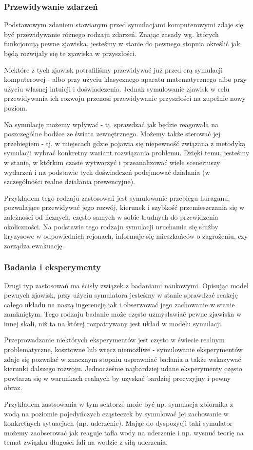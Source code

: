 \subsubsection{Przewidywanie zdarzeń}
\par{
Podstawowym zdaniem stawianym przed symulacjami komputerowymi zdaje się być przewidywanie różnego rodzaju zdarzeń. Znając zasady wg. których funkcjonują pewne zjawiska, jesteśmy w stanie do pewnego stopnia określić jak będą rozwijały się te zjawiska w przyszłości.
}
\par{
Niektóre z tych zjawisk potrafiliśmy przewidywać już przed erą symulacji komputerowej - albo przy użyciu klasycznego aparatu matematycznego albo przy użyciu własnej intuicji i doświadczenia. Jednak symulowanie zjawisk w celu przewidywania ich rozwoju przenosi przewidywanie przyszłości na zupełnie nowy poziom.
}
\par{
Na symulację możemy wpływać - tj. sprawdzać jak będzie reagowała na poszczególne bodźce ze świata zewnętrznego. Możemy także sterować jej przebiegiem - tj. w miejscach gdzie pojawia się niepewność związana z metodyką symulacji wybrać konkretny wariant rozwiązania problemu.
Dzięki temu, jesteśmy w stanie, w którkim czasie wytworzyć i przeanalizować wiele sceneriuszy wydarzeń i na podstawie tych doświadczeń podejmować działania (w szczególności realne działania prewencyjne).
}
\par{
Przykładem tego rodzaju zastosowań jest symulowanie przebiegu huraganu, pozwalające przewidywać jego rozwój, kierunek i szybkość przemieszczania się w zależności od licznych, często samych w sobie trudnych do przewidzenia okoliczności. Na podstawie tego rodzaju symulacji uruchamia się służby kryzysowe w odpowiednich rejonach, informuje się mieszkańców o zagrożeniu, czy zarządza ewakuację.
}

\subsubsection{Badania i eksperymenty}
\par{
Drugi typ zastosowań ma ścisły związek z badaniami naukowymi.
Opisując model pewnych zjawisk, przy użyciu symulatora jesteśmy w stanie sprawdzać reakcję całego układu na naszą ingerencję jak i obserwować jego zachowanie w stanie zamkniętym. Tego rodzaju badanie może często uzmysławiać pewne zjawiska w innej skali, niż ta na której rozpatrywany jest układ w modelu symulacji.
}
\par{
Przeprowadzanie niektórych eksperymentów jest często w świecie realnym problematyczne, kosztowne lub wręcz niemożliwe - symulowanie eksperymentów zdaje się pozwalać w znacznym stopniu usprawniać badania a także wskazywać kierunki dalszego rozwoju. Jednocześnie najbardziej udane eksperymenty często powtarza się w warunkach realnych by uzyskać bardziej precyzyjny i pewny obraz.
}
\par{
Przykładem zastsowania w tym sektorze może być np. symulacja zbiornika z wodą na poziomie pojedyńczych cząsteczek by symulować jej zachowanie w konkretnych sytuacjach (np. uderzenie). Mając do dyspozycji taki symulator możemy zaobserować jak reaguje tafla wody na uderzenie i np. wysnuć teorię na temat związku długości fali na wodzie z siłą uderzenia.
}

